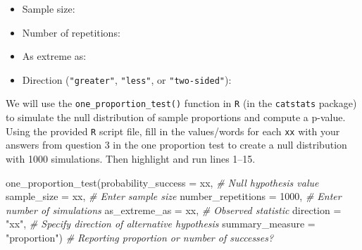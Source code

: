 \documentclass[
]{report}
\newenvironment{Shaded}{\begin{snugshade}}{\end{snugshade}}
\newcommand{\AttributeTok}[1]{\textcolor[rgb]{0.77,0.63,0.00}{#1}}
\newcommand{\CommentTok}[1]{\textcolor[rgb]{0.56,0.35,0.01}{\textit{#1}}}
\newcommand{\DecValTok}[1]{\textcolor[rgb]{0.00,0.00,0.81}{#1}}
\newcommand{\FunctionTok}[1]{\textcolor[rgb]{0.00,0.00,0.00}{#1}}
\newcommand{\NormalTok}[1]{#1}
\newcommand{\StringTok}[1]{\textcolor[rgb]{0.31,0.60,0.02}{#1}}
\providecommand{\tightlist}{%
  \setlength{\itemsep}{0pt}\setlength{\parskip}{0pt}}
\begin{document}
\vspace{.2in}

\begin{itemize}
\tightlist
\item
  Sample size:
\end{itemize}

\vspace{.2in}

\begin{itemize}
\tightlist
\item
  Number of repetitions:
\end{itemize}

\vspace{.2in}

\begin{itemize}
\tightlist
\item
  As extreme as:
\end{itemize}

\vspace{.2in}

\begin{itemize}
\tightlist
\item
  Direction (\texttt{"greater"}, \texttt{"less"}, or \texttt{"two-sided"}):
\end{itemize}

\newpage

We will use the \texttt{one\_proportion\_test()} function in \texttt{R} (in the \texttt{catstats} package) to simulate the null distribution of sample proportions and compute a p-value. Using the provided \texttt{R} script file, fill in the values/words for each \texttt{xx} with your answers from question 3 in the one proportion test to create a null distribution with 1000 simulations. Then highlight and run lines 1--15.

\begin{Shaded}
\begin{Highlighting}[]
\FunctionTok{one\_proportion\_test}\NormalTok{(}\AttributeTok{probability\_success =}\NormalTok{ xx, }\CommentTok{\# Null hypothesis value}
          \AttributeTok{sample\_size =}\NormalTok{ xx, }\CommentTok{\# Enter sample size}
          \AttributeTok{number\_repetitions =} \DecValTok{1000}\NormalTok{, }\CommentTok{\# Enter number of simulations}
          \AttributeTok{as\_extreme\_as =}\NormalTok{ xx, }\CommentTok{\# Observed statistic}
          \AttributeTok{direction =} \StringTok{"xx"}\NormalTok{, }\CommentTok{\# Specify direction of alternative hypothesis}
          \AttributeTok{summary\_measure =} \StringTok{"proportion"}\NormalTok{) }\CommentTok{\# Reporting proportion or number of successes?}
\end{Highlighting}
\end{Shaded}
\end{document}
